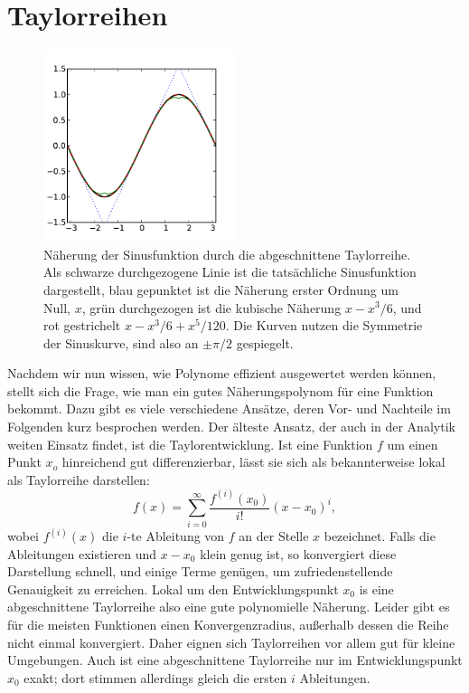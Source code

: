 \section{Taylorreihen}

\begin{figure}
  \centering
  \includegraphics[width=0.5\textwidth]{plots/sinus}
  \caption{Näherung der Sinusfunktion durch die abgeschnittene
    Taylorreihe. Als schwarze durchgezogene Linie ist die tatsächliche
    Sinusfunktion dargestellt, blau gepunktet ist die Näherung erster
    Ordnung um Null, $x$, grün durchgezogen ist die kubische Näherung
    $x - x^3/6$, und rot gestrichelt $x-x^3/6 + x^5/120$. Die Kurven
    nutzen die Symmetrie der Sinuskurve, sind also an $\pm\pi/2$
    gespiegelt.}
  \label{fig:sinus}
\end{figure}

Nachdem wir nun wissen, wie Polynome effizient ausgewertet werden
können, stellt sich die Frage, wie man ein gutes Näherungspolynom für
eine Funktion bekommt. Dazu gibt es viele verschiedene Ansätze, deren
Vor- und Nachteile im Folgenden kurz besprochen werden. Der älteste
Ansatz, der auch in der Analytik weiten Einsatz findet, ist die
Taylorentwicklung.  Ist eine Funktion $f$ um einen Punkt $x_o$
hinreichend gut differenzierbar, lässt sie sich als bekannterweise
lokal als Taylorreihe darstellen:
\begin{equation}
  f(x) = \sum_{i=0}^\infty \frac{f^{(i)}(x_0)}{i!} (x-x_0)^i,
  \label{eq:taylor}
\end{equation}
wobei $f^{(i)}(x)$ die $i$-te Ableitung von $f$ an der Stelle $x$
bezeichnet.  Falls die Ableitungen existieren und $x-x_0$ klein genug
ist, so konvergiert diese Darstellung schnell, und einige Terme
genügen, um zufriedenstellende Genauigkeit zu erreichen. Lokal um den
Entwicklungspunkt $x_0$ is eine abgeschnittene Taylorreihe also eine
gute polynomielle Näherung. Leider gibt es für die meisten Funktionen
einen Konvergenzradius, außerhalb dessen die Reihe nicht einmal
konvergiert. Daher eignen sich Taylorreihen vor allem gut für kleine
Umgebungen. Auch ist eine abgeschnittene Taylorreihe nur im
Entwicklungspunkt $x_0$ exakt; dort stimmen allerdings gleich die
ersten $i$ Ableitungen.

